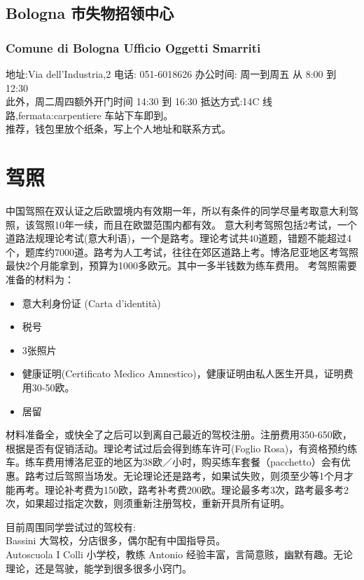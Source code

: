 \subsection{Bologna 市失物招领中心}
\subsubsection{Comune di Bologna Ufficio Oggetti Smarriti}
地址:Via dell’Industria,2 电话: 051-6018626 办公时间: 周一到周五 从 8:00 到 12:30 \\
此外，周二周四额外开门时间 14:30 到 16:30 抵达方式:14C 线路,fermata:carpentiere 车站下车即到。 \\
推荐，钱包里放个纸条，写上个人地址和联系方式。


\section{驾照}

中国驾照在双认证之后欧盟境内有效期一年，所以有条件的同学尽量考取意大利驾照，该驾照10年一续，而且在欧盟范围内都有效。
意大利考驾照包括2考试，一个道路法规理论考试(意大利语)，一个是路考。理论考试共40道题，错题不能超过4个，题库约7000道。路考为人工考试，往往在郊区道路上考。博洛尼亚地区考驾照最快2个月能拿到，预算为1000多欧元。其中一多半钱数为练车费用。
考驾照需要准备的材料为：
\begin{itemize}
\item 意大利身份证 (Carta d’identità)
\item 税号
\item 3张照片
\item 健康证明(Certificato Medico Amnestico)，健康证明由私人医生开具，证明费用30-50欧。
\item 居留
\end{itemize}
材料准备全，或快全了之后可以到离自己最近的驾校注册。注册费用350-650欧，根据是否有促销活动。理论考试过后会得到练车许可(Foglio Rosa)，有资格预约练车。练车费用博洛尼亚的地区为38欧／小时，购买练车套餐（pacchetto）会有优惠。路考过后驾照当场发。无论理论还是路考，如果试失败，则须至少等1个月才能再考。理论补考费为150欧，路考补考费200欧。理论最多考3次，路考最多考2次，如果超过指定次数，则须重新注册驾校，重新开具所有证明。


\noindent 目前周围同学尝试过的驾校有: \\
Bassini 大驾校，分店很多，偶尔配有中国指导员。\\
Autoscuola I Colli 小学校，教练 Antonio 经验丰富，言简意赅，幽默有趣。无论理论，还是驾驶，能学到很多很多小窍门。





